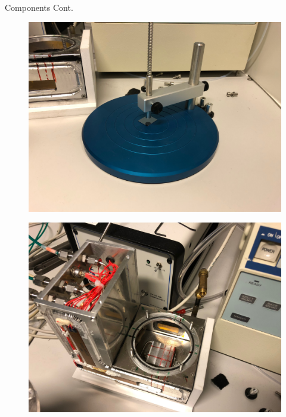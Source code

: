 \documentclass[10pt]{beamer}
\begin{document}
		\begin{frame}{Components Cont.}
		\begin{minipage}{0.47\textwidth}
		\begin{figure}
		\includegraphics[scale=0.04]{setup3.JPG}
		\end{figure}
		\end{minipage}
		\begin{minipage}{0.5\textwidth}
		\begin{figure}
		\includegraphics[scale=0.04]{setup4.JPG}
		\end{figure}
		\end{minipage}
		\end{frame}
	
\end{document}
